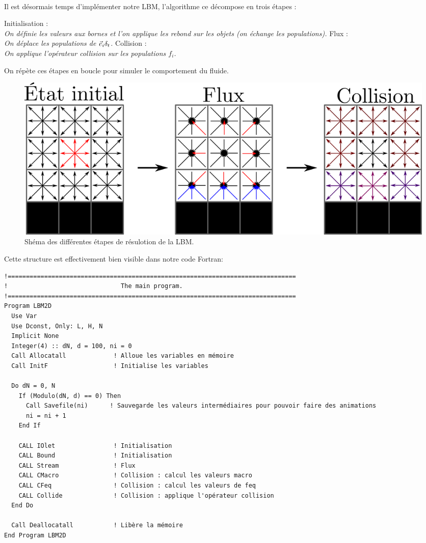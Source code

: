 \paragraph*{}
  Il est désormais temps d'implémenter notre LBM, l'algorithme ce décompose en trois étapes :
  \begin{itemize} \label{eq:defmeso}
    \itemb Initialisation :\\
    \emph{On définie les valeurs aux bornes et l'on applique les rebond sur les objets (on échange les populations).}
    \itemb Flux :\\
    \emph{On déplace les populations de $\vec{e}_i \delta_t$.}
    \itemb Collision :\\
    \emph{On applique l'opérateur collision sur les populations $f_i$.}  
  \end{itemize}
  On répète ces étapes en boucle pour simuler le comportement du fluide.
  
  \begin{figure}[hbtp]
    \centering
    \includegraphics[width=\linewidth]{Fig/algorithme.pdf}
    \caption{Shéma des différentes étapes de résulotion de la LBM.}
  \end{figure}
  
   Cette structure est effectivement bien visible dans notre code {\sc Fortran}:
  \begin{verbatim}
!===============================================================================
!                               The main program.
!===============================================================================
Program LBM2D
  Use Var
  Use Dconst, Only: L, H, N
  Implicit None
  Integer(4) :: dN, d = 100, ni = 0
  Call Allocatall             ! Alloue les variables en mémoire
  Call InitF                  ! Initialise les variables
  
  Do dN = 0, N
    If (Modulo(dN, d) == 0) Then      
      Call Savefile(ni)      ! Sauvegarde les valeurs intermédiaires pour pouvoir faire des animations
      ni = ni + 1
    End If

    CALL IOlet                ! Initialisation
    CALL Bound                ! Initialisation
    CALL Stream               ! Flux
    CALL CMacro               ! Collision : calcul les valeurs macro
    CALL CFeq                 ! Collision : calcul les valeurs de feq
    CALL Collide              ! Collision : applique l'opérateur collision
  End Do
  
  Call Deallocatall           ! Libère la mémoire
End Program LBM2D
  \end{verbatim}
  
